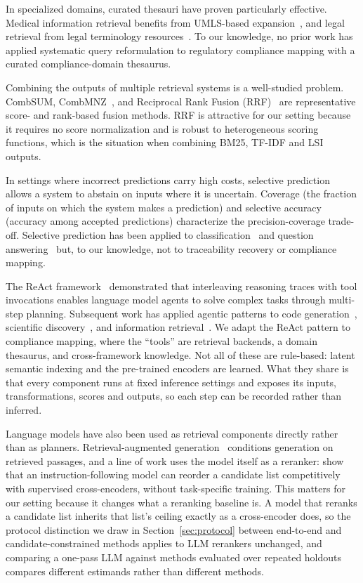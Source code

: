 \documentclass[a4paper,fleqn]{cas-sc}
\begin{document}
In specialized domains, curated thesauri have proven particularly effective.
Medical information retrieval benefits from UMLS-based expansion~\citep{Aronson2010}, and legal retrieval from legal terminology resources~\citep{Maxwell2017}.
To our knowledge, no prior work has applied systematic query reformulation to regulatory compliance mapping with a curated compliance-domain thesaurus.

Combining the outputs of multiple retrieval systems is a well-studied problem.
CombSUM, CombMNZ~\citep{Fox1994}, and Reciprocal Rank Fusion (RRF)~\citep{Cormack2009} are representative score- and rank-based fusion methods.
RRF is attractive for our setting because it requires no score normalization and is robust to heterogeneous scoring functions, which is the situation when combining BM25, TF-IDF and LSI outputs.

In settings where incorrect predictions carry high costs, selective prediction~\citep{ElYaniv2010,Geifman2017} allows a system to abstain on inputs where it is uncertain.
Coverage (the fraction of inputs on which the system makes a prediction) and selective accuracy (accuracy among accepted predictions) characterize the precision-coverage trade-off.
Selective prediction has been applied to classification~\citep{Geifman2019} and question answering~\citep{Kamath2020} but, to our knowledge, not to traceability recovery or compliance mapping.

The ReAct framework~\citep{Yao2023} demonstrated that interleaving reasoning traces with tool invocations enables language model agents to solve complex tasks through multi-step planning.
Subsequent work has applied agentic patterns to code generation~\citep{Yang2024}, scientific discovery~\citep{Bran2024}, and information retrieval~\citep{Shao2024}.
We adapt the ReAct pattern to compliance mapping, where the ``tools'' are retrieval backends, a domain thesaurus, and cross-framework knowledge. Not all of these are rule-based: latent semantic indexing and the pre-trained encoders are learned. What they share is that every component runs at fixed inference settings and exposes its inputs, transformations, scores and outputs, so each step can be recorded rather than inferred.

Language models have also been used as retrieval components directly rather than as planners.
Retrieval-augmented generation~\citep{Lewis2020} conditions generation on retrieved passages, and a line of work uses the model itself as a reranker: \citet{Sun2023} show that an instruction-following model can reorder a candidate list competitively with supervised cross-encoders, without task-specific training.
This matters for our setting because it changes what a reranking baseline is.
A model that reranks a candidate list inherits that list's ceiling exactly as a cross-encoder does, so the protocol distinction we draw in Section~\ref{sec:protocol} between end-to-end and candidate-constrained methods applies to LLM rerankers unchanged, and comparing a one-pass LLM against methods evaluated over repeated holdouts compares different estimands rather than different methods.
\end{document}
